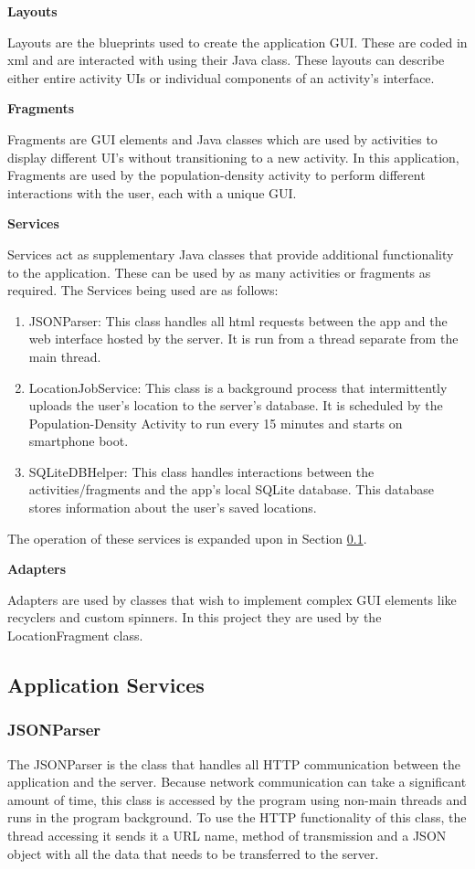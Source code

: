\textbf{Layouts}

Layouts are the blueprints used to create the application GUI. These are coded in xml and are interacted with using their Java class. These layouts can describe either entire activity UIs or individual components of an activity's interface.

\textbf{Fragments}

Fragments are GUI elements and Java classes which are used by activities to display different UI's without transitioning to a new activity. In this application, Fragments are used by the population-density activity to perform different interactions with the user, each with a unique GUI.

\textbf{Services}

Services act as supplementary Java classes that provide additional functionality to the application. These can be used by as many activities or fragments as required. The Services being used are as follows:
\begin{enumerate}
    \item JSONParser: This class handles all html requests between the app and the web interface hosted by the server. It is run from a thread separate from the main thread.
    \item LocationJobService: This class is a background process that intermittently uploads the user's location to the server's database. It is scheduled by the Population-Density Activity to run every 15 minutes and starts on smartphone boot.
    \item SQLiteDBHelper: This class handles interactions between the activities/fragments and the app's local SQLite database. This database stores information about the user's saved locations.
\end{enumerate}
The operation of these services is expanded upon in Section \ref{sec:app_services}.

\textbf{Adapters}

Adapters are used by classes that wish to implement complex GUI elements like recyclers and custom spinners. In this project they are used by the LocationFragment class. 

\subsection{Application Services} 
\label{sec:app_services}

\subsubsection{JSONParser}
The JSONParser is the class that handles all HTTP communication between the application and the server. Because network communication can take a significant amount of time, this class is accessed by the program using non-main threads and runs in the program background. To use the HTTP functionality of this class, the thread accessing it sends it a URL name, method of transmission and a JSON object with all the data that needs to be transferred to the server.

